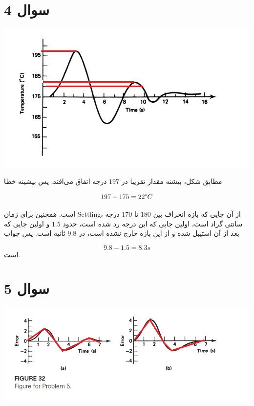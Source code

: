 \documentclass[12pt]{article}
\begin{document}
\KashidaOff


\section*{سوال 4}

\begin{center}
\includegraphics[width = 1.0 \textwidth]{images/1.png}
\end{center}

مطابق شکل، بیشنه مقدار تقریبا در $197$ درجه اتفاق می‌افتد. پس بیشینه خطا

$$197 - 175 = 22 \degree C $$

است. همچنین برای زمان Settling، از آن جایی که بازه انحراف بین $180$ تا $170$ درجه سانتی گراد است، اولین جایی که این درجه رد شده است، حدود $1.5$ و اولین جایی که بعد از آن استیبل شده و از این بازه خارج نشده است، در  $9.8$ ثانیه است. پس جواب

$$9.8 - 1.5 = 8.3 s$$
است.


\section*{سوال 5}


\begin{center}
	\includegraphics[width = 1.0 \textwidth]{images/2.png}
\end{center}
\end{document}
